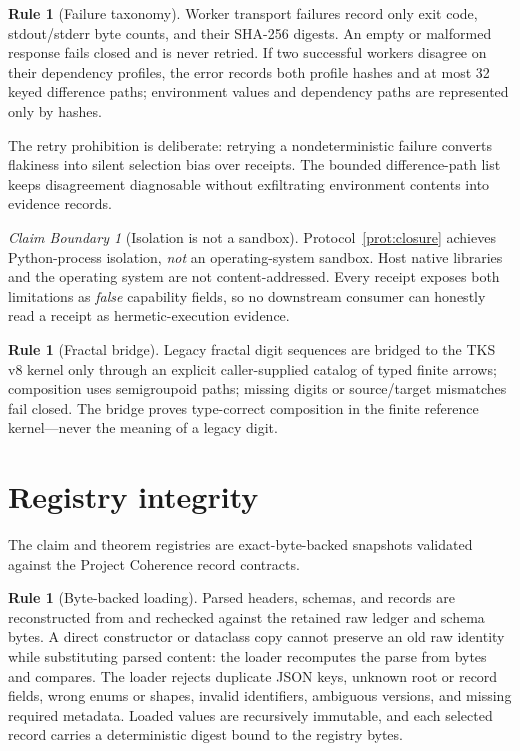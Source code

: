 \documentclass[11pt]{amsart}
\theoremstyle{definition}
\newtheorem{ruleenv}[theorem]{Rule}
\theoremstyle{remark}
\newtheorem{boundary}[theorem]{Claim Boundary}
\begin{document}
\begin{ruleenv}[Failure taxonomy]\label{rule:failures}
Worker transport failures record only exit code, stdout/stderr byte counts, and their SHA-256 digests. An empty or malformed response fails closed and is never retried. If two successful workers disagree on their dependency profiles, the error records both profile hashes and at most 32 keyed difference paths; environment values and dependency paths are represented only by hashes.
\end{ruleenv}

The retry prohibition is deliberate: retrying a nondeterministic failure converts flakiness into silent selection bias over receipts. The bounded difference-path list keeps disagreement diagnosable without exfiltrating environment contents into evidence records.

\begin{boundary}[Isolation is not a sandbox]\label{bd:sandbox}
Protocol~\ref{prot:closure} achieves Python-process isolation, \emph{not} an operating-system sandbox. Host native libraries and the operating system are not content-addressed. Every receipt exposes both limitations as \emph{false} capability fields, so no downstream consumer can honestly read a receipt as hermetic-execution evidence.
\end{boundary}

\begin{ruleenv}[Fractal bridge]\label{rule:fractal}
Legacy fractal digit sequences are bridged to the TKS v8 kernel only through an explicit caller-supplied catalog of typed finite arrows; composition uses semigroupoid paths; missing digits or source/target mismatches fail closed. The bridge proves type-correct composition in the finite reference kernel---never the meaning of a legacy digit.
\end{ruleenv}

\section{Registry integrity}\label{sec:registry}

The claim and theorem registries are exact-byte-backed snapshots validated against the Project Coherence record contracts.

\begin{ruleenv}[Byte-backed loading]\label{rule:registry}
Parsed headers, schemas, and records are reconstructed from and rechecked against the retained raw ledger and schema bytes. A direct constructor or dataclass copy cannot preserve an old raw identity while substituting parsed content: the loader recomputes the parse from bytes and compares. The loader rejects duplicate JSON keys, unknown root or record fields, wrong enums or shapes, invalid identifiers, ambiguous versions, and missing required metadata. Loaded values are recursively immutable, and each selected record carries a deterministic digest bound to the registry bytes.
\end{ruleenv}
\end{document}
